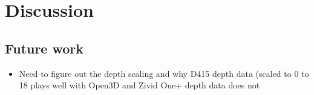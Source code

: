 

\chapter{Discussion}
\label{Discussion} 

\lipsum[1]

\section{Future work}
\begin{itemize}
    \item Need to figure out the depth scaling and why D415 depth data (scaled to 0 to 18 plays well with Open3D and Zivid One+ depth data does not
\end{itemize}

